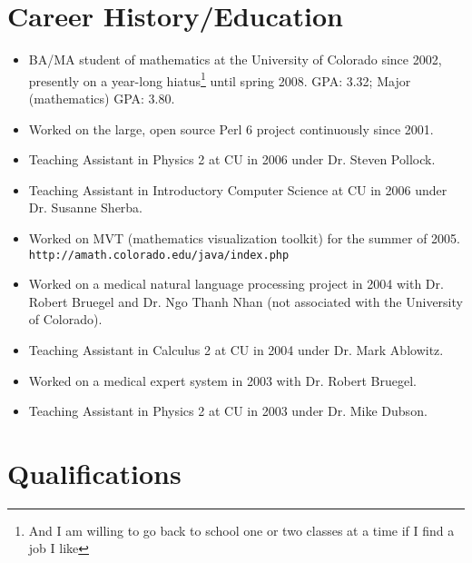 \documentclass[12pt]{article}
\begin{document}
\section*{Career History/Education}

\begin{itemize}
\item BA/MA student of mathematics at the University of Colorado since
2002, presently on a year-long hiatus\footnote{And I am willing to go
back to school one or two classes at a time if I find a job I like}
until spring 2008.  GPA: 3.32; Major (mathematics) GPA: 3.80.  \item
Worked on the large, open source Perl 6 project continuously since
2001.
\item Teaching Assistant in Physics 2 at CU in 2006 under Dr. Steven
Pollock.
\item Teaching Assistant in Introductory Computer Science at CU in 2006
under Dr. Susanne Sherba.
\item Worked on MVT (mathematics visualization toolkit) for the summer
of 2005. \verb|http://amath.colorado.edu/java/index.php|
\item Worked on a medical natural language processing project in 2004 with
Dr. Robert Bruegel and Dr. Ngo Thanh Nhan (not associated with the
University of Colorado).
\item Teaching Assistant in Calculus 2 at CU in 2004 under Dr. Mark
Ablowitz.
\item Worked on a medical expert system in 2003 with Dr. Robert Bruegel.
\item Teaching Assistant in Physics 2 at CU in 2003 under Dr. Mike
Dubson.
\end{itemize}

\section*{Qualifications}
\end{document}
